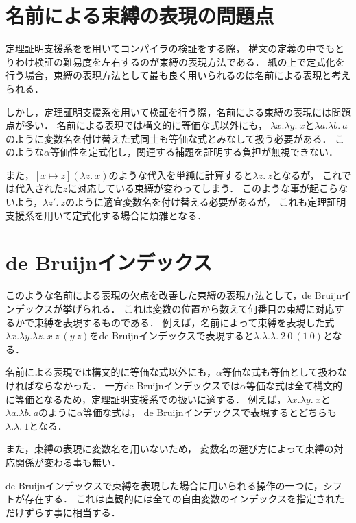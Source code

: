 \documentclass{sumiilab-paper}
\begin{document}
\section{名前による束縛の表現の問題点}
定理証明支援系をを用いてコンパイラの検証をする際，
構文の定義の中でもとりわけ検証の難易度を左右するのが束縛の表現方法である．
紙の上で定式化を行う場合，束縛の表現方法として最も良く用いられるのは名前による表現と考えられる．

しかし，定理証明支援系を用いて検証を行う際，名前による束縛の表現には問題点が多い．
名前による表現では構文的に等価な式以外にも，
$\lambda x.\lambda y.~x$と$\lambda a.\lambda b.~a$のように変数名を付け替えた式同士も等価な式とみなして扱う必要がある．
このような$\alpha$等価性を定式化し，関連する補題を証明する負担が無視できない．

また，$[x \mapsto z](\lambda z.~x)$のような代入を単純に計算すると$\lambda z.~z$となるが，
これでは代入された$z$に対応している束縛が変わってしまう．
このような事が起こらないよう，$\lambda z'.~z$のように適宜変数名を付け替える必要があるが，
これも定理証明支援系を用いて定式化する場合に煩雑となる．

\section{de Bruijnインデックス}
このような名前による表現の欠点を改善した束縛の表現方法として，de Bruijnインデックス\cite{Pierce:TypeSystems}が挙げられる．
これは変数の位置から数えて何番目の束縛に対応するかで束縛を表現するものである．
例えば，名前によって束縛を表現した式$\lambda x. \lambda y. \lambda z.~x~z~(y~z)$をde Bruijnインデックスで表現すると$\lambda. \lambda. \lambda.~2~0~(1~0)$となる．

名前による表現では構文的に等価な式以外にも，$\alpha$等価な式も等価として扱わなければならなかった．
一方de Bruijnインデックスでは$\alpha$等価な式は全て構文的に等価となるため，定理証明支援系での扱いに適する．
例えば，$\lambda x.\lambda y.~x$と$\lambda a.\lambda b.~a$のように$\alpha$等価な式は，
de Bruijnインデックスで表現するとどちらも$\lambda.\lambda.~1$となる．

また，束縛の表現に変数名を用いないため，
変数名の選び方によって束縛の対応関係が変わる事も無い．

de Bruijnインデックスで束縛を表現した場合に用いられる操作の一つに，シフトが存在する．
これは直観的には全ての自由変数のインデックスを指定されただけずらす事に相当する．
\end{document}
